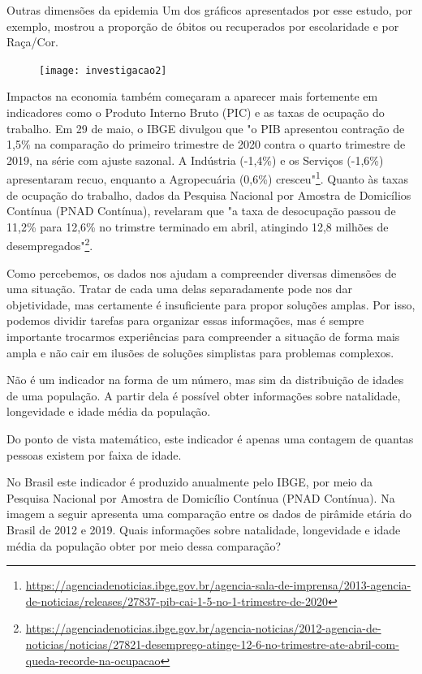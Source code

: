 \begin{example}{Outras dimensões da epidemia}
Um dos gráficos apresentados por esse estudo, por exemplo, mostrou a proporção de óbitos ou recuperados por escolaridade e por Raça/Cor.

\begin{figure}[H]
\centering
\texttt{[image: investigacao2]}

\end{figure}

Impactos na economia também começaram a aparecer mais fortemente em indicadores como o Produto Interno Bruto (PIC) e as taxas de ocupação do trabalho. Em 29 de maio, o IBGE divulgou que "o PIB apresentou contração de 1,5\% na comparação do primeiro trimestre de 2020 contra o quarto trimestre de 2019, na série com ajuste sazonal. A Indústria (-1,4\%) e os Serviços (-1,6\%) apresentaram recuo, enquanto a Agropecuária (0,6\%) cresceu"\footnote{\url{https://agenciadenoticias.ibge.gov.br/agencia-sala-de-imprensa/2013-agencia-de-noticias/releases/27837-pib-cai-1-5-no-1-trimestre-de-2020}}. Quanto às taxas de ocupação do trabalho, dados da Pesquisa Nacional por Amostra de Domicílios Contínua (PNAD Contínua), revelaram que "a taxa de desocupação passou de 11,2\% para 12,6\% no trimstre terminado em abril, atingindo 12,8 milhões de desempregados"\footnote{\url{https://agenciadenoticias.ibge.gov.br/agencia-noticias/2012-agencia-de-noticias/noticias/27821-desemprego-atinge-12-6-no-trimestre-ate-abril-com-queda-recorde-na-ocupacao}}.

Como percebemos, os dados nos ajudam a compreender diversas dimensões de uma situação. Tratar de cada uma delas separadamente pode nos dar objetividade, mas certamente é insuficiente para propor soluções amplas. Por isso, podemos dividir tarefas para organizar essas informações, mas é sempre importante trocarmos experiências para compreender a situação de forma mais ampla e não cair em ilusões de soluções simplistas para problemas complexos.
\end{example}



Não é um indicador na forma de um número, mas sim da distribuição de idades de uma população. A partir dela é possível obter informações sobre natalidade, longevidade e idade média da população.

Do ponto de vista matemático, este indicador é apenas uma contagem de quantas pessoas existem por faixa de idade.

No Brasil este indicador é produzido anualmente pelo IBGE, por meio da Pesquisa Nacional por Amostra de Domicílio Contínua (PNAD Contínua). Na imagem a seguir apresenta uma comparação entre os dados de pirâmide etária do Brasil de 2012 e 2019. Quais informações sobre natalidade, longevidade e idade média da população obter por meio dessa comparação?

